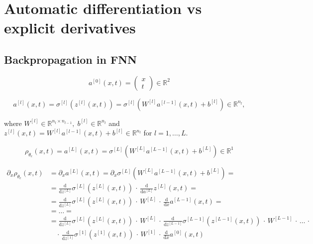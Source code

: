 \section{Automatic differentiation vs explicit derivatives}
\label{ch3:sec3}



\subsection{Backpropagation in FNN}

\begin{equation*}
    a^{[0]}(x,t) = \begin{pmatrix} x \\ t \end{pmatrix} \in \mathbb{R}^2
\end{equation*}

\begin{equation*}
    a^{[l]}(x,t) = \sigma^{[l]} (z^{[l]}(x,t)) = \sigma^{[l]} (W^{[l]} a^{[l-1]}(x,t) + b^{[l]}) \in \mathbb{R}^{n_l}, 
\end{equation*}

where $W^{[l]} \in \mathbb{R}^{n_l \times n_{l-1}}, \; b^{[l]} \in \mathbb{R}^{n_l}$ and $z^{[l]}(x,t) = W^{[l]} a^{[l-1]}(x,t) + b^{[l]} \in \mathbb{R}^{n_l}$ for $l = 1, \ldots, L$.

\begin{equation*}
    \rho_{\theta_e}(x, t) = a^{[L]}(x,t) = \sigma^{[L]} (W^{[L]} a^{[L-1]}(x,t) + b^{[L]}) \in \mathbb{R}^{1} 
\end{equation*}

\begin{align*}
    \partial_x \rho_{\theta_e}(x, t) & =  \partial_x a^{[L]}(x,t) = \partial_x \sigma^{[L]} (W^{[L]} a^{[L-1]}(x,t) + b^{[L]}) = \\
    & =  \frac{\mathrm{d}}{\mathrm{d} z^{[L]}} \sigma^{[L]} (z^{[L]}(x,t)) \, \cdot \, \frac{\mathrm{d}}{\mathrm{d} a^{[L]}} z^{[L]}(x,t) = \\ 
    & =  \frac{\mathrm{d}}{\mathrm{d} z^{[L]}} \sigma^{[L]} (z^{[L]}(x,t)) \, \cdot \, W^{[L]} \, \cdot \, \frac{\mathrm{d}}{\mathrm{d} x} a^{[L-1]}(x,t) = \\
    & =  \ldots = \\
    & =  \frac{\mathrm{d}}{\mathrm{d} z^{[L]}} \sigma^{[L]} (z^{[L]}(x,t)) \, \cdot \, W^{[L]} \, \cdot \, \frac{\mathrm{d}}{\mathrm{d} z^{[L-1]}} \sigma^{[L-1]} (z^{[L-1]}(x,t)) \, \cdot \, W^{[L-1]} \, \cdot \, \ldots \, \cdot \\
    & \quad \cdot \, \frac{\mathrm{d}}{\mathrm{d} z^{[1]}} \sigma^{[1]} (z^{[1]}(x,t)) \, \cdot \, W^{[1]} \, \cdot \,\frac{\mathrm{d}}{\mathrm{d} x} a^{[0]}(x,t) 
\end{align*}
    
